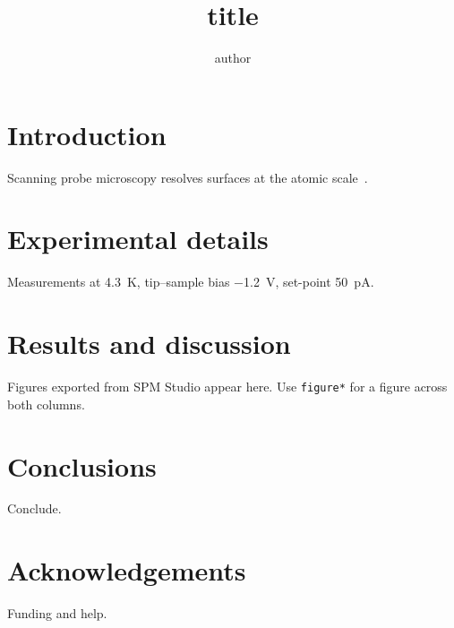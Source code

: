 \documentclass[10pt,a4paper,twocolumn]{article}
\title{\textbf{ {{title}} }}
\author[1]{ {{author}} }
\affil[1]{Department, University, City, Country}
\date{}
\begin{document}

\section{Introduction}
Scanning probe microscopy resolves surfaces at the atomic scale~\cite{binnig1982}.

\section{Experimental details}
Measurements at \SI{4.3}{\kelvin}, tip--sample bias \SI{-1.2}{\volt}, set-point \SI{50}{\pico\ampere}.

\section{Results and discussion}
Figures exported from SPM Studio appear here. Use \texttt{figure*} for a figure across both columns.

\section{Conclusions}
Conclude.

\section*{Acknowledgements}
Funding and help.



\end{document}
